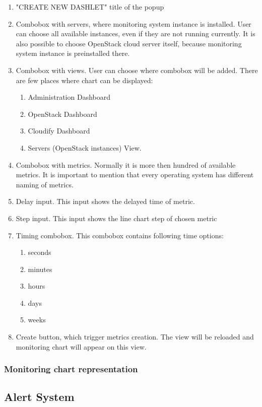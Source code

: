 \begin{enumerate}
\item "CREATE NEW DASHLET" title of the popup
\item Combobox with servers, where monitoring system instance is installed. User can choose all available instances, even if they are not running currently. It is also possible to choose OpenStack cloud server itself, because monitoring system instance is preinstalled there.
\item Combobox with views.  User can choose where combobox will be added. There are few places where chart can be displayed:
\begin{enumerate}
\item Administration Dashboard
\item OpenStack Dashboard
\item Cloudify Dashboard
\item Servers (OpenStack instances) View. 
\end{enumerate}
\item Combobox with metrics. Normally it is more then hundred of available metrics. It is important to mention that every operating system has different naming of metrics.
\item Delay input. This input shows the delayed time of metric.
\item Step input. This input shows the line chart step of chosen metric
\item Timing combobox. This combobox contains following time options:
\begin{enumerate}
\item seconds
\item minutes
\item hours
\item days
\item weeks
\end{enumerate}
\item Create button, which trigger metrics creation. The view will be reloaded and monitoring chart will appear on this view.
\end{enumerate}

\subsubsection{Monitoring chart representation}\label{Monitoring chart representation}


\subsection{Alert System}\label{Alerting System}


